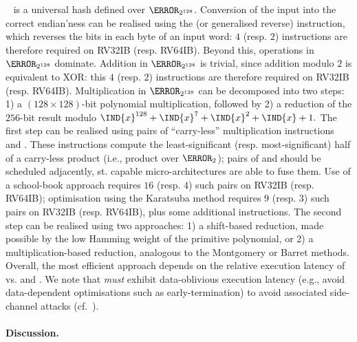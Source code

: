 ~\cite[Section 6.4]{NIST:sp.800.38d} is a universal hash defined 
over $\F_{2^{128}}$.
Conversion of the input into the correct endian'ness can be realised using
the 
 (or generalised reverse)
instruction,
which reverses the bits in each byte of an input word:
$4$ (resp. $2$) 
instructions are therefore required on RV32IB (resp. RV64IB).
Beyond this, operations in $\F_{2^{128}}$ dominate.
Addition       in $\F_{2^{128}}$ 
is trivial, since addition modulo $2$ is equivalent to XOR: this
$4$ (resp. $2$) 
instructions are therefore required on RV32IB (resp. RV64IB).
Multiplication in $\F_{2^{128}}$ 
can be decomposed into two steps:
1) a $( 128 \times 128 )$-bit polynomial multiplication, 
   followed by 
2) a reduction of the $256$-bit result modulo
   $
   \IND{x}^{128} + \IND{x}^{7} + \IND{x}^{2} + \IND{x} + 1 .
   $
The first  step 
can be realised using pairs of ``carry-less'' multiplication instructions
 and .
These instructions compute the least-significant (resp. most-significant) 
half of a carry-less product (i.e., product over $\F_2$); pairs of 
 and 
should be scheduled adjacently, st. capable micro-architectures are able 
to fuse them.
Use of a school-book approach 
requires
$16$ (resp. $4$) such pairs 
on RV32IB (resp. RV64IB);
optimisation using the Karatsuba method
requires
$ 9$ (resp. $3$) such pairs 
on RV32IB (resp. RV64IB),
plus some additional  instructions.
The second step
can be realised using two approaches:
1) a          shift-based reduction, made possible by the low Hamming weight of the primitive polynomial,
   or
2) a multiplication-based reduction, analogous to the Montgomery or Barret methods.
Overall, the most efficient approach depends on the relative execution 
latency of
vs.
 and .
We note that 
{\em must} exhibit data-oblivious execution latency 
(e.g., avoid data-dependent optimisations such as early-termination)
to avoid associated side-channel attacks (cf.~\cite{GOPT:09}).


\paragraph{Discussion.}

